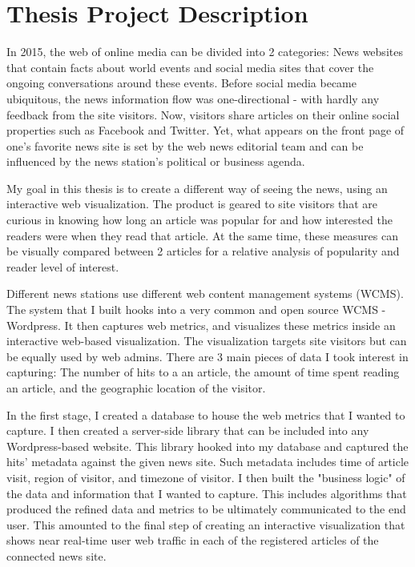\documentclass[12pt]{article}
\begin{document}
\begin{singlespace}
\tableofcontents
\end{singlespace}

\vfill

\section{Thesis Project Description}
In 2015, the web of online media can be divided into 2 categories: News websites that contain facts about world events and social media sites that cover the ongoing conversations around these events. Before social media became ubiquitous, the news information flow was one-directional - with hardly any feedback from the site visitors. Now, visitors share articles on their online social properties such as Facebook and Twitter. Yet, what appears on the front page of one's favorite news site is set by the web news editorial team and can be influenced by the news station's political or business agenda. 

My goal in this thesis is to create a different way of seeing the news, using an interactive web visualization. The product is geared to site visitors that are curious in knowing how long an article was popular for and how interested the readers were when they read that article. At the same time, these measures can be visually compared between 2 articles for a relative analysis of popularity and reader level of interest. 

Different news stations use different web content management systems (WCMS). The system that I built hooks into a very common and open source WCMS - Wordpress. It then captures web metrics, and visualizes these metrics inside an interactive web-based visualization. The visualization targets site visitors but can be equally used by web admins. There are 3 main pieces of data I took interest in capturing: The number of hits to a an article, the amount of time spent reading an article, and the geographic location of the visitor. 

In the first stage, I created a database to house the web metrics that I wanted to capture. I then created a server-side library that can be included into any Wordpress-based website. This library hooked into my database and captured the hits' metadata against the given news site. Such metadata includes time of article visit, region of visitor, and timezone of visitor.  
I then built the "business logic" of the data and information that I wanted to capture. This includes algorithms that produced the refined data and metrics to be ultimately communicated to the end user.
This amounted to the final step of creating an interactive visualization that shows near real-time user web traffic in each of the registered articles of the connected news site.
\end{document}
